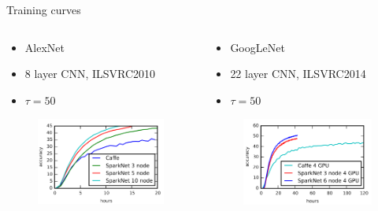 \documentclass[pdf]{beamer}
\begin{document}
\begin{frame}[t]{Training curves}
    \begin{columns}
        \begin{column}{0.5\textwidth}
            \begin{itemize}
                \item AlexNet \cite{krizhevsky2012imagenet}
                \item 8 layer CNN, ILSVRC2010
                \item $\tau=50$
            \end{itemize}
            \begin{figure}[htpb]
                \centering
                \includegraphics[width=\linewidth]{Figures/single-gpu.png}
            \end{figure}
        \end{column}
        \begin{column}{0.5\textwidth}
            \begin{itemize}
                \item GoogLeNet \cite{szegedy2015going}
                \item 22 layer CNN, ILSVRC2014
                \item $\tau=50$
            \end{itemize}
            \begin{figure}[htpb]
                \centering
                \includegraphics[width=\linewidth]{Figures/multi-gpu.png}

\end{figure}
\end{column}
\end{columns}
\end{frame}
\end{document}
